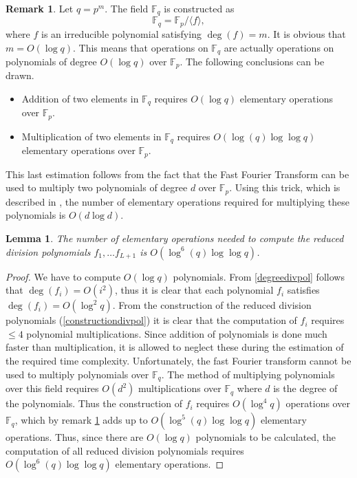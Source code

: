 \documentclass{article}
\numberwithin{equation}{section}
\newtheorem{lemma}[theorem]{Lemma}
\theoremstyle{definition}
\newtheorem{remark}[theorem]{Remark}
\newcommand{\FF}[1]{{\mathbb F}_{#1}} %
\newcommand{\grgen}[1]{\langle #1 \rangle} %
\newcommand{\degree}[1]{\operatorname{deg} \left(#1\right)} %
\begin{document}
\begin{remark}\label{complFq}
Let $q=p^m$. The field $\FF{q}$ is constructed as $$\FF{q} = \FF{p}/\grgen{f},$$ where $f$ is an irreducible polynomial satisfying $\degree{f}=m$. It is obvious that $m=O(\log q)$. This means that operations on $\FF{q}$ are actually operations on polynomials of degree $O(\log q)$ over $\FF{p}$. The following conclusions can be drawn. 
\begin{itemize}
\item Addition of two elements in $\FF{q}$ requires $O(\log q)$ elementary operations over $\FF{p}$.
\item Multiplication of two elements in $\FF{q}$ requires $O(\log (q) \log \log q)$ elementary operations over $\FF{p}$.
\end{itemize} 
\end{remark}

This last estimation follows from the fact that the Fast Fourier Transform can be used to multiply two polynomials of degree $d$ over $\FF{p}$. Using this trick, which is described in \cite[3.3]{Winkler}, the number of elementary operations required for multiplying these polynomials is $O(d \log d)$.

\begin{lemma}
The number of elementary operations needed to compute the reduced division polynomials $f_1,\ldots f_{L+1}$ is $O(\log ^6 (q) \log \log q)$.
\end{lemma}

\begin{proof}
We have to compute $O(\log q)$ polynomials. From \ref{degreedivpol} follows that $\degree{f_i}=O(i^2)$, thus it is clear that each polynomial $f_i$ satisfies $\degree{f_i}=O(\log^2 q)$. From the construction of the reduced division polynomials (\ref{constructiondivpol}) it is clear that the computation of $f_i$ requires $\leq 4$ polynomial multiplications. Since addition of polynomials is done much faster than multiplication, it is allowed to neglect these during the estimation of the required time complexity. Unfortunately, the fast Fourier transform cannot be used to multiply polynomials over $\FF{q}$. The method of multiplying polynomials over this field requires $O(d^2)$ multiplications over $\FF{q}$ where $d$ is the degree of the polynomials. Thus the construction of $f_i$ requires $O(\log^4 q)$ operations over $\FF{q}$, which by remark \ref{complFq} adds up to $O(\log^5 (q) \log \log q)$ elementary operations. Thus, since there are $O(\log q)$ polynomials to be calculated, the computation of all reduced division polynomials requires $O(\log^6 (q) \log \log q)$ elementary operations. 
\end{proof}
\end{document}
